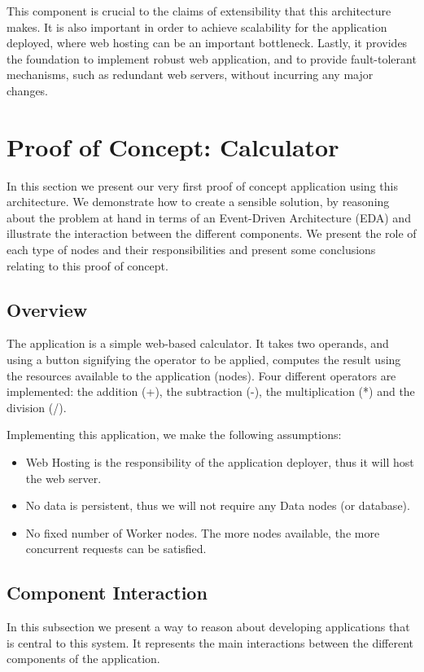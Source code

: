 \documentclass[12pt, titlepage]{uo_temp}
\begin{document}
     This component is crucial to the claims of extensibility that this architecture
     makes. It is also important in order to achieve scalability for the application
     deployed, where web hosting can be an important bottleneck. Lastly, it provides the
     foundation to implement robust web application, and to provide fault-tolerant
     mechanisms, such as redundant web servers, without incurring any major changes. 
 
     \section{Proof of Concept: Calculator}
     In this section we present our very first proof of concept application using this
     architecture. We demonstrate how to create a sensible solution, by reasoning about
     the problem at hand in terms of an Event-Driven Architecture (EDA) and illustrate the
     interaction between the different components. We present the role of each type of
     nodes and their responsibilities and present some conclusions relating to this proof
     of concept.
     
     \subsection{Overview}
     The application is a simple web-based calculator. It takes two operands, and
     using a button signifying the operator to be applied, computes the result using the
     resources available to the application (nodes). Four different operators are
     implemented: the addition (+), the subtraction (-), the multiplication (*) and the
     division (/).  

     Implementing this application, we make the following assumptions:
     \begin{itemize}
       \item Web Hosting is the responsibility of the application deployer, thus it will
         host the web server.
       \item No data is persistent, thus we will not require any Data nodes (or database).
       \item No fixed number of Worker nodes. The more nodes available, the more
         concurrent requests can be satisfied.
     \end{itemize}
     
     \subsection{Component Interaction}
     In this subsection we present a way to reason about developing applications that is
     central to this system. It represents the main interactions between the different
     components of the application.
 
\end{document}
